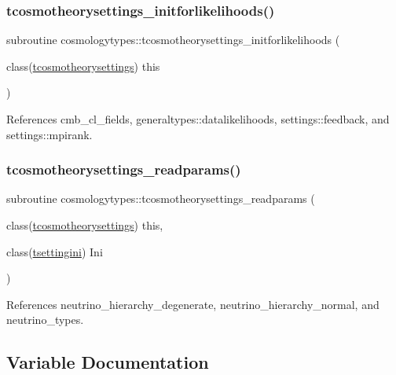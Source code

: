 \subsubsection{\texorpdfstring{tcosmotheorysettings\+\_\+initforlikelihoods()}{tcosmotheorysettings\_initforlikelihoods()}}
{\footnotesize\ttfamily subroutine cosmologytypes\+::tcosmotheorysettings\+\_\+initforlikelihoods (\begin{DoxyParamCaption}\item[{class(\mbox{\hyperlink{structcosmologytypes_1_1tcosmotheorysettings}{tcosmotheorysettings}})}]{this }\end{DoxyParamCaption})}



References cmb\+\_\+cl\+\_\+fields, generaltypes\+::datalikelihoods, settings\+::feedback, and settings\+::mpirank.

\mbox{\label{namespacecosmologytypes_a1a69426bf9f630b4e02bb612ca1406ea}} 
\subsubsection{\texorpdfstring{tcosmotheorysettings\+\_\+readparams()}{tcosmotheorysettings\_readparams()}}
{\footnotesize\ttfamily subroutine cosmologytypes\+::tcosmotheorysettings\+\_\+readparams (\begin{DoxyParamCaption}\item[{class(\mbox{\hyperlink{structcosmologytypes_1_1tcosmotheorysettings}{tcosmotheorysettings}})}]{this,  }\item[{class(\mbox{\hyperlink{structsettings_1_1tsettingini}{tsettingini}})}]{Ini }\end{DoxyParamCaption})}



References neutrino\+\_\+hierarchy\+\_\+degenerate, neutrino\+\_\+hierarchy\+\_\+normal, and neutrino\+\_\+types.



\subsection{Variable Documentation}
\mbox{\label{namespacecosmologytypes_a865a3713806fafe97fbe476029dc0387}} 
